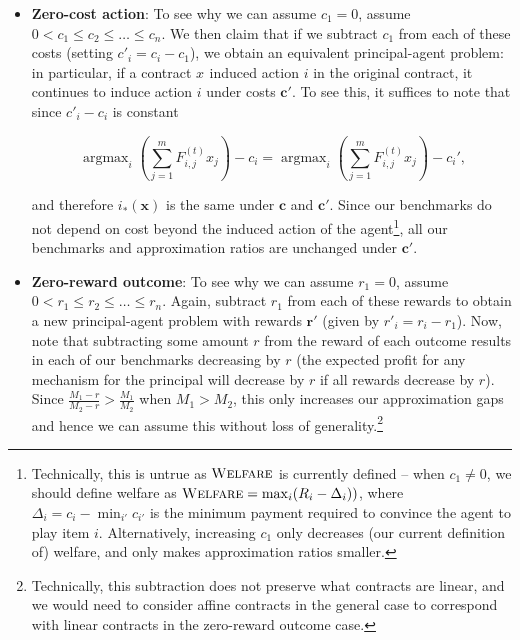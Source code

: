 \documentclass{article}
\DeclareMathOperator*{\argmax}{argmax}
\newcommand{\Cost}[1]{c_{#1}}
\newcommand{\CostVector}{\bm{c}}
\newcommand{\TypedForecast}[3]{F^{(#1)}_{#2, #3}}
\newcommand{\RewardVector}{\bm{r}}
\newcommand{\Contract}[1]{x_{#1}}
\newcommand{\ContractVector}{\bm{x}}
\newcommand{\OptimalAction}{i_*}
\newcommand{\OWelfare}{\textsc{Welfare}}
\begin{document}
\begin{itemize}
  \item \textbf{Zero-cost action}: To see why we can assume $c_{1} = 0$, assume $0 < c_{1} \leq c_{2} \leq \dots \leq c_{n}$. We then claim that if we subtract $c_{1}$ from each of these costs (setting $c'_{i} = c_{i} - c_{1}$), we obtain an equivalent principal-agent problem: in particular, if a contract $\Contract{}$ induced action $i$ in the original contract, it continues to induce action $i$ under costs $\CostVector'$. To see this, it suffices to note that since $c'_{i} - c_{i}$ is constant
    
  $$\argmax_i \left( \sum_{j=1}^m \TypedForecast{t}{i}{j} \Contract{j} \right) - \Cost{i} = \argmax_i \left( \sum_{j=1}^m \TypedForecast{t}{i}{j} \Contract{j} \right) - \Cost{i}' \text{,}$$

  and therefore $\OptimalAction(\ContractVector)$ is the same under $\CostVector$ and $\CostVector'$. Since our benchmarks do not depend on cost beyond the induced action of the agent\footnote{Technically, this is untrue as $\OWelfare$ is currently defined -- when $c_1 \neq 0$, we should define welfare as $\OWelfare = \max_{i}(R_{i} - \Delta_i))$, where $\Delta_i = c_{i} - \min_{i'}c_{i'}$ is the minimum payment required to convince the agent to play item $i$. Alternatively, increasing $c_1$ only decreases (our current definition of) welfare, and only makes approximation ratios smaller.}, all our benchmarks and approximation ratios are unchanged under $\CostVector'$. 
    
  \item \textbf{Zero-reward outcome}: To see why we can assume $r_{1} = 0$, assume $0 < r_{1} \leq r_{2} \leq \dots \leq r_{n}$. Again, subtract $r_{1}$ from each of these rewards to obtain a new principal-agent problem with rewards $\RewardVector'$ (given by $r'_{i} = r_{i} - r_{1}$). Now, note that subtracting some amount $r$ from the reward of each outcome results in each of our benchmarks decreasing by $r$ (the expected profit for any mechanism for the principal will decrease by $r$ if all rewards decrease by $r$). Since $\frac{M_{1} - r}{M_{2} - r} > \frac{M_{1}}{M_{2}}$ when $M_{1} > M_{2}$, this only increases our approximation gaps and hence we can assume this without loss of generality.\footnote{Technically, this subtraction does not preserve what contracts are linear, and we would need to consider affine contracts in the general case to correspond with linear contracts in the zero-reward outcome case.}
\end{itemize}%
\end{document}
